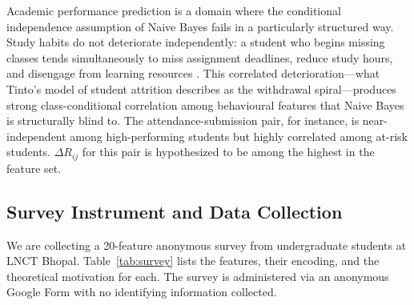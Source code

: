 \documentclass[conference]{IEEEtran}
\begin{document}
Academic performance prediction is a domain where the conditional
independence assumption of Naive Bayes fails in a particularly structured
way.
Study habits do not deteriorate independently: a student who begins
missing classes tends simultaneously to miss assignment deadlines, reduce
study hours, and disengage from learning resources \cite{crede2008}.
This correlated deterioration---what Tinto's \cite{tinto1987} model of
student attrition describes as the withdrawal spiral---produces strong
class-conditional correlation among behavioural features that Naive Bayes
is structurally blind to.
The attendance-submission pair, for instance, is near-independent among
high-performing students but highly correlated among at-risk students.
$\Delta R_{ij}$ for this pair is hypothesized to be among the highest in the
feature set.

\subsection{Survey Instrument and Data Collection}

We are collecting a 20-feature anonymous survey from undergraduate students
at LNCT Bhopal.
Table~\ref{tab:survey} lists the features, their encoding, and the
theoretical motivation for each.
The survey is administered via an anonymous Google Form with no identifying
information collected.
\end{document}
